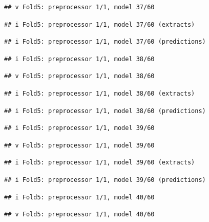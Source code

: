 \documentclass[
]{article}
\begin{document}
\begin{verbatim}
## v Fold5: preprocessor 1/1, model 37/60
\end{verbatim}

\begin{verbatim}
## i Fold5: preprocessor 1/1, model 37/60 (extracts)
\end{verbatim}

\begin{verbatim}
## i Fold5: preprocessor 1/1, model 37/60 (predictions)
\end{verbatim}

\begin{verbatim}
## i Fold5: preprocessor 1/1, model 38/60
\end{verbatim}

\begin{verbatim}
## v Fold5: preprocessor 1/1, model 38/60
\end{verbatim}

\begin{verbatim}
## i Fold5: preprocessor 1/1, model 38/60 (extracts)
\end{verbatim}

\begin{verbatim}
## i Fold5: preprocessor 1/1, model 38/60 (predictions)
\end{verbatim}

\begin{verbatim}
## i Fold5: preprocessor 1/1, model 39/60
\end{verbatim}

\begin{verbatim}
## v Fold5: preprocessor 1/1, model 39/60
\end{verbatim}

\begin{verbatim}
## i Fold5: preprocessor 1/1, model 39/60 (extracts)
\end{verbatim}

\begin{verbatim}
## i Fold5: preprocessor 1/1, model 39/60 (predictions)
\end{verbatim}

\begin{verbatim}
## i Fold5: preprocessor 1/1, model 40/60
\end{verbatim}

\begin{verbatim}
## v Fold5: preprocessor 1/1, model 40/60
\end{verbatim}
\end{document}
